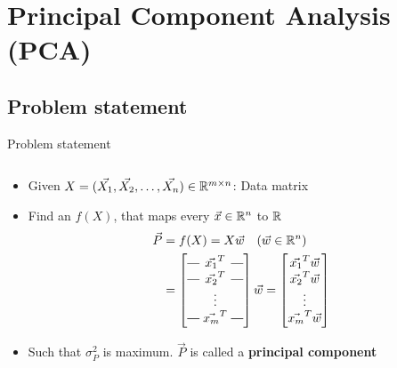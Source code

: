 \section{Principal Component Analysis (PCA)}

\subsection{Problem statement}

\begin{frame}{Problem statement}
    \begin{columns}
        \begin{column}{0.7\textwidth}
            \begin{itemize}
                \item Given $X = (\vec{X_1}, \vec{X_2},\dots,\vec{X_n}) \in \mathbb{R}^{m\times n}$: Data matrix
                \item Find an $f(X)$, that maps every $\vec{x} \in \mathbb{R}^n$ to $\mathbb{R}$
                \begin{align*}
                    \vec{P} &= f(X)= X\vec{w}\quad (\vec{w}\in \R^{n})\\
                    &= \brows{
                        \vec{x_1}^T \\
                        \vec{x_2}^T \\
                        \rowsvdots \\
                        \vec{x_m}^T} \vec{w} = \begin{bmatrix}
                            \vec{x_1}^T\vec{w} \\
                            \vec{x_2}^T\vec{w} \\
                            \vdots \\
                            \vec{x_m}^T\vec{w}
                        \end{bmatrix}
                \end{align*}
                \item \alert{Such that $\sigma^2_{P}$ is maximum}. $\vec{P}$ is called a \textbf{principal component}
            \end{itemize}
        \end{column}


\end{columns}
\end{frame}
